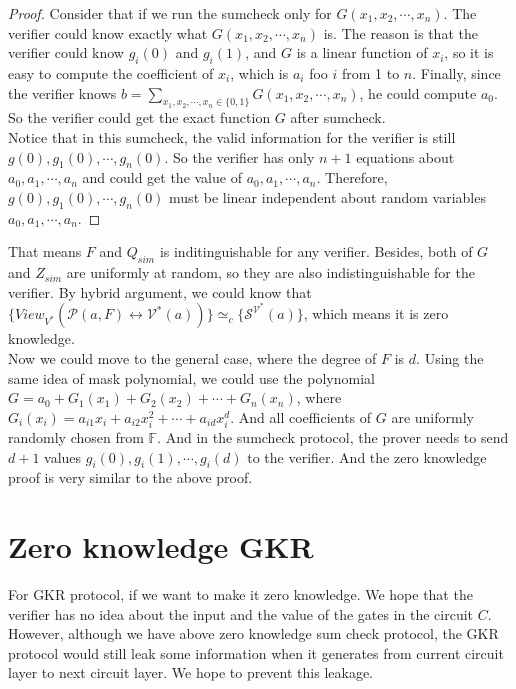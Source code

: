 \begin{proof}
Consider that if we run the sumcheck only for $G(x_1, x_2, \cdots, x_n)$. The verifier could know exactly what $G(x_1, x_2, \cdots, x_n)$ is. The reason is that the verifier could know $g_{i}(0)$ and $g_{i}(1)$, and $G$ is a linear function of $x_i$, so it is easy to compute the coefficient of $x_i$, which is $a_i$ foo $i$ from 1 to $n$. Finally, since the verifier knows $b = \sum\limits_{x_1, x_2, \cdots, x_n \in \{0, 1\}}G(x_1, x_2, \cdots, x_n)$, he could compute $a_0$. So the verifier could get the exact function $G$ after sumcheck.\\  

Notice that in this sumcheck, the valid information for the verifier is still $g(0), g_{1}(0), \cdots, g_{n}(0)$. So the verifier has only $n + 1$ equations about $a_0, a_1, \cdots, a_n$ and could get the value of $a_0, a_1, \cdots, a_n$. Therefore, $g(0), g_{1}(0), \cdots, g_{n}(0)$ must be linear independent about random variables $a_0, a_1, \cdots, a_n$.
\end{proof}

That means $F$ and $Q_{sim}$ is inditinguishable for any verifier. Besides, both of $G$ and $Z_{sim}$ are uniformly at random, so they are also indistinguishable for the verifier. By hybrid argument, we could know that $\{View_{V^*}(\mathcal{P}(a, F) \leftrightarrow \mathcal{V^*}(a))\} \simeq_{c} \{\mathcal{S}^{\mathcal{V^*}}(a)\}$, which means it is zero knowledge.\\

\noindent
Now we could move to the general case, where the degree of $F$ is $d$. Using the same idea of mask polynomial, we could use the polynomial $G = a_{0} + G_1(x_1) + G_2(x_2) + \cdots + G_n(x_n)$, where $G_{i}(x_i) = a_{i1}x_i + a_{i2}x_i^2 + \cdots + a_{id}x_i^d$. And all coefficients of $G$ are uniformly randomly chosen from $\mathbb{F}$. And in the sumcheck protocol, the prover needs to send $d+1$ values $g_{i}(0), g_{i}(1), \cdots, g_i(d)$ to the verifier. And the zero knowledge proof is very similar to the above proof. 

\section{Zero knowledge GKR}

For GKR protocol, if we want to make it zero knowledge. We hope that the verifier has no idea about the input and the value of the gates in the circuit $C$. However, although we have above zero knowledge sum check protocol, the GKR protocol would still leak some information when it generates from current circuit layer to next circuit layer. We hope to prevent this leakage.\\

